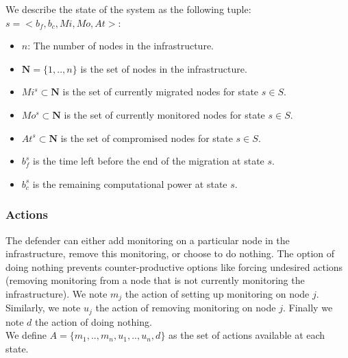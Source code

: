 
We describe the state of the system as the following tuple: $s=<b_f,b_c,Mi,Mo,At>$:
\begin{itemize}
    \item $n$: The number of nodes in the infrastructure.
    \item $\textbf{N} = \{1,..,n\}$ is the set of nodes in the infrastructure.
    \item $Mi^s \subset \textbf{N} $ is the set of currently migrated nodes for state $s\in S$.
    \item $Mo^s \subset \textbf{N}$ is the set of currently monitored nodes for state $s\in S$.
    \item $At^s \subset \textbf{N}$ is the set of compromised nodes for state $s \in S$.
    \item $b_f^s$ is the time left before the end of the migration at state $s$.
    \item $b_c^s$ is the remaining computational power at state $s$.
\end{itemize}


\subsubsection{Actions}
\label{sec:actionset}
The defender can either add monitoring on a particular node in the infrastructure, remove this monitoring, or choose to do nothing.
The option of doing nothing prevents counter-productive options like forcing undesired actions (\eg removing monitoring from a node that is not currently monitoring the infrastructure).
We note $m_j$ the action of setting up monitoring on node $j$. Similarly, we note $u_j$ the action of removing monitoring on node $j$.
Finally we note $d$ the action of doing nothing.
\\We define $A = \{m_1,..,m_n,u_1,..,u_n,d\}$ as the set of actions available at each state.


